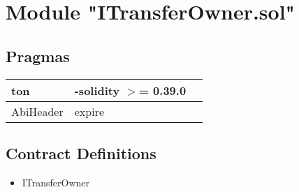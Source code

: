 
\section{Module "ITransferOwner.sol"}


\subsection{Pragmas}


\noindent\begin{tabular}{|l|l|p{5cm}|}\hline
ton & -solidity $>$= 0.39.0 &\\\hline
AbiHeader &  expire &\\\hline
\end{tabular}


\subsection{Contract Definitions}

\begin{itemize}
\item ITransferOwner
\end{itemize}

